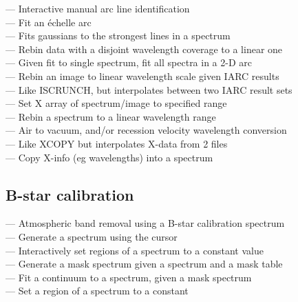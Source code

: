  --- Interactive manual arc line identification\\
 --- Fit an \'echelle arc\\
 --- Fits gaussians to the strongest lines in a spectrum\\
 --- Rebin data with a disjoint wavelength coverage to a linear one\\
 --- Given fit to single spectrum, fit all spectra in a 2-D arc\\
 --- Rebin an image to linear wavelength scale given IARC results\\
 --- Like ISCRUNCH, but interpolates between two IARC result sets\\
 --- Set X array of spectrum/image to specified range\\
 --- Rebin a spectrum to a linear wavelength range\\
 --- Air to vacuum, and/or recession velocity wavelength conversion\\
 --- Like XCOPY but interpolates X-data from 2 files\\
 --- Copy X-info (eg wavelengths) into a spectrum


\subsection{\label{classifbstars}B-star calibration}

 --- Atmospheric band removal using a B-star calibration spectrum\\
 --- Generate a spectrum using the cursor\\
 --- Interactively set regions of a spectrum to a constant value\\
 --- Generate a mask spectrum given a spectrum and a mask table\\
 --- Fit a continuum to a spectrum, given a mask spectrum\\
 --- Set a region of a spectrum to a constant



